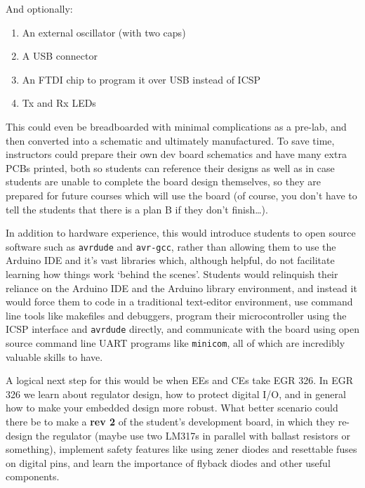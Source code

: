 \documentclass[12pt]{article}
\numberwithin{figure}{section}
\numberwithin{equation}{section}
\begin{document}
{And optionally:

\begin{enumerate}
\itemsep1pt\parskip0pt
\item An external oscillator (with two caps)
\item A USB connector
\item An FTDI chip to program it over USB instead of ICSP
\item Tx and Rx LEDs
\end{enumerate}

This could even be breadboarded with minimal complications as a pre-lab,
and then converted into a schematic and ultimately manufactured. To save
time, instructors could prepare their own dev board schematics and have
many extra PCBs printed, both so students can reference their designs as
well as in case students are unable to complete the board design
themselves, so they are prepared for future courses which will use the
board (of course, you don't have to tell the students that there is a
plan B if they don't finish\ldots{}).

\bigskip

In addition to hardware experience, this would introduce students to
open source software such as \texttt{avrdude} and \texttt{avr-gcc},
rather than allowing them to use the Arduino IDE and it's vast libraries
which, although helpful, do not facilitate learning how things work
`behind the scenes'. Students would relinquish their reliance on the
Arduino IDE and the Arduino library environment, and instead it would
force them to code in a traditional text-editor environment, use command
line tools like makefiles and debuggers, program their microcontroller
using the ICSP interface and \texttt{avrdude} directly, and communicate
with the board using open source command line UART programs like
\texttt{minicom}, all of which are incredibly valuable skills to have.

\bigskip

A logical next step for this would be when EEs and CEs take EGR 326. In
EGR 326 we learn about regulator design, how to protect digital I/O, and
in general how to make your embedded design more robust. What better
scenario could there be to make a \textbf{rev 2} of the student's
development board, in which they re-design the regulator (maybe use two
LM317s in parallel with ballast resistors or something), implement
safety features like using zener diodes and resettable fuses on digital
pins, and learn the importance of flyback diodes and other useful
components.

}
\end{document}
